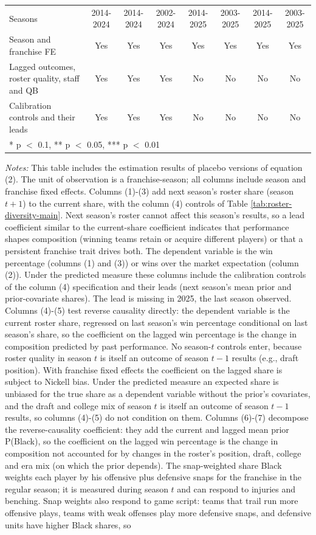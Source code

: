 \begin{table}[H]
{\begin{tabular}[t]{lccccccc}
Seasons & 2014-2024 & 2014-2024 & 2002-2024 & 2014-2025 & 2003-2025 & 2014-2025 & 2003-2025\\
Season and franchise FE & Yes & Yes & Yes & Yes & Yes & Yes & Yes\\
Lagged outcomes, roster quality, staff and QB & Yes & Yes & Yes & No & No & No & No\\
Calibration controls and their leads & Yes & Yes & Yes & No & No & No & No\\
\bottomrule
\multicolumn{8}{l}{\rule{0pt}{1em}* p $<$ 0.1, ** p $<$ 0.05, *** p $<$ 0.01}\\
\end{tabular}}
\end{table}

{\footnotesize
\noindent\textit{Notes:} This table includes the estimation results of placebo versions of equation (2). The unit of observation is a franchise-season; all columns include season and franchise fixed effects. Columns (1)-(3) add next season's roster share (season $t+1$) to the current share, with the column (4) controls of Table \ref{tab:roster-diversity-main}. Next season's roster cannot affect this season's results, so a lead coefficient similar to the current-share coefficient indicates that performance shapes composition (winning teams retain or acquire different players) or that a persistent franchise trait drives both. The dependent variable is the win percentage (columns (1) and (3)) or wins over the market expectation (column (2)). Under the predicted measure these columns include the calibration controls of the column (4) specification and their leads (next season's mean prior and prior-covariate shares).  The lead is missing in 2025, the last season observed. Columns (4)-(5) test reverse causality directly: the dependent variable is the current roster share, regressed on last season's win percentage conditional on last season's share, so the coefficient on the lagged win percentage is the change in composition predicted by past performance. No season-$t$ controls enter, because roster quality in season $t$ is itself an outcome of season $t-1$ results (e.g., draft position). With franchise fixed effects the coefficient on the lagged share is subject to Nickell bias. Under the predicted measure an expected share is unbiased for the true share as a dependent variable without the prior's covariates, and the draft and college mix of season $t$ is itself an outcome of season $t-1$ results, so columns (4)-(5) do not condition on them. Columns (6)-(7) decompose the reverse-causality coefficient: they add the current and lagged mean prior P(Black), so the coefficient on the lagged win percentage is the change in composition not accounted for by changes in the roster's position, draft, college and era mix (on which the prior depends). The snap-weighted share Black weights each player by his offensive plus defensive snaps for the franchise in the regular season; it is measured during season $t$ and can respond to injuries and benching. Snap weights also respond to game script: teams that trail run more offensive plays, teams with weak offenses play more defensive snaps, and defensive units have higher Black shares, so }
